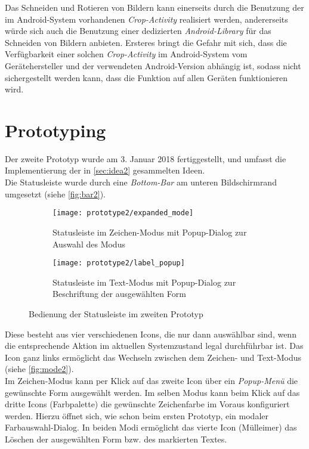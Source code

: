 Das Schneiden und Rotieren von Bildern kann einerseits durch die Benutzung der im Android-System vorhandenen \emph{Crop-Activity} realisiert werden, andererseits würde sich auch die Benutzung einer dedizierten \emph{Android-Library} für das Schneiden von Bildern anbieten.
Ersteres bringt die Gefahr mit sich, dass die Verfügbarkeit einer solchen \emph{Crop-Activity} im Android-System vom Gerätehersteller und der verwendeten Android-Version abhängig ist, sodass nicht sichergestellt werden kann, dass die Funktion auf allen Geräten funktionieren wird. \\

\section{Prototyping}
Der zweite Prototyp wurde am 3. Januar 2018 fertiggestellt, und umfasst die Implementierung der in \autoref{sec:idea2} gesammelten Ideen. \\

Die Statusleiste wurde durch eine \emph{Bottom-Bar} am unteren Bildschirmrand umgesetzt (siehe \autoref{fig:bar2}).

\begin{figure}[ht]
  \begin{subfigure}[t]{0.4\textwidth}
    \texttt{[image: prototype2/expanded\_mode]}
    \caption{Statusleiste im Zeichen-Modus mit Popup-Dialog zur Auswahl des Modus}
    \label{fig:mode2}
  \end{subfigure}
  \begin{subfigure}[t]{0.4\textwidth}
    \texttt{[image: prototype2/label\_popup]}
    \caption{Statusleiste im Text-Modus mit Popup-Dialog zur Beschriftung der ausgewählten Form}
    \label{fig:labelp2}
  \end{subfigure}
  \centering
  \caption{Bedienung der Statusleiste im zweiten Prototyp}
  \label{fig:bar2}
\end{figure}

\noindent
Diese besteht aus vier verschiedenen Icons, die nur dann auswählbar sind, wenn die entsprechende Aktion im aktuellen Systemzustand legal durchführbar ist.
Das Icon ganz links ermöglicht das Wechseln zwischen dem Zeichen- und Text-Modus (siehe \autoref{fig:mode2}). \\

Im Zeichen-Modus kann per Klick auf das zweite Icon über ein \emph{Popup-Menü} die gewünschte Form ausgewählt werden. 
Im selben Modus kann beim Klick auf das dritte Icons (Farbpalette) die gewünschte Zeichenfarbe im Voraus konfiguriert werden. Hierzu öffnet sich, wie schon beim ersten Prototyp, ein modaler Farbauswahl-Dialog.
In beiden Modi ermöglicht das vierte Icon (Mülleimer) das Löschen der ausgewählten Form bzw. des markierten Textes. \\

